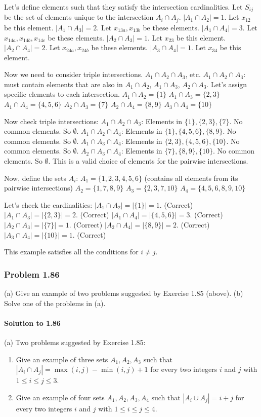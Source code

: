 \documentclass{article}
\begin{document}
\begin{itemize}
Let's define elements such that they satisfy the intersection cardinalities.
Let $S_{ij}$ be the set of elements unique to the intersection $A_i \cap A_j$.
$|A_1 \cap A_2| = 1$. Let $x_{12}$ be this element.
$|A_1 \cap A_3| = 2$. Let $x_{13a}, x_{13b}$ be these elements.
$|A_1 \cap A_4| = 3$. Let $x_{14a}, x_{14b}, x_{14c}$ be these elements.
$|A_2 \cap A_3| = 1$. Let $x_{23}$ be this element.
$|A_2 \cap A_4| = 2$. Let $x_{24a}, x_{24b}$ be these elements.
$|A_3 \cap A_4| = 1$. Let $x_{34}$ be this element.

Now we need to consider triple intersections. $A_1 \cap A_2 \cap A_3$, etc.
$A_1 \cap A_2 \cap A_3$: must contain elements that are also in $A_1 \cap A_2$, $A_1 \cap A_3$, $A_2 \cap A_3$.
Let's assign specific elements to each intersection.
$A_1 \cap A_2 = \{1\}$
$A_1 \cap A_3 = \{2, 3\}$
$A_1 \cap A_4 = \{4, 5, 6\}$
$A_2 \cap A_3 = \{7\}$
$A_2 \cap A_4 = \{8, 9\}$
$A_3 \cap A_4 = \{10\}$

Now check triple intersections:
$A_1 \cap A_2 \cap A_3$: Elements in $\{1\}, \{2,3\}, \{7\}$. No common elements. So $\emptyset$.
$A_1 \cap A_2 \cap A_4$: Elements in $\{1\}, \{4,5,6\}, \{8,9\}$. No common elements. So $\emptyset$.
$A_1 \cap A_3 \cap A_4$: Elements in $\{2,3\}, \{4,5,6\}, \{10\}$. No common elements. So $\emptyset$.
$A_2 \cap A_3 \cap A_4$: Elements in $\{7\}, \{8,9\}, \{10\}$. No common elements. So $\emptyset$.
This is a valid choice of elements for the pairwise intersections.

Now, define the sets $A_i$:
$A_1 = \{1, 2, 3, 4, 5, 6\}$ (contains all elements from its pairwise intersections)
$A_2 = \{1, 7, 8, 9\}$
$A_3 = \{2, 3, 7, 10\}$
$A_4 = \{4, 5, 6, 8, 9, 10\}$

Let's check the cardinalities:
$|A_1 \cap A_2| = |\{1\}| = 1$. (Correct)
$|A_1 \cap A_3| = |\{2, 3\}| = 2$. (Correct)
$|A_1 \cap A_4| = |\{4, 5, 6\}| = 3$. (Correct)
$|A_2 \cap A_3| = |\{7\}| = 1$. (Correct)
$|A_2 \cap A_4| = |\{8, 9\}| = 2$. (Correct)
$|A_3 \cap A_4| = |\{10\}| = 1$. (Correct)

This example satisfies all the conditions for $i \ne j$.

\subsubsection*{Problem 1.86}
(a) Give an example of two problems suggested by Exercise 1.85 (above).
(b) Solve one of the problems in (a).

\paragraph*{Solution to 1.86}
(a) Two problems suggested by Exercise 1.85:
\begin{enumerate}
    \item Give an example of three sets $A_1, A_2, A_3$ such that $|A_i \cap A_j| = \max(i, j) - \min(i, j) + 1$ for every two integers $i$ and $j$ with $1 \le i \le j \le 3$.
    \item Give an example of four sets $A_1, A_2, A_3, A_4$ such that $|A_i \cup A_j| = i+j$ for every two integers $i$ and $j$ with $1 \le i \le j \le 4$.
\end{enumerate}


\end{itemize}
\end{document}
